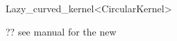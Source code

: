 \begin{ccRefClass}{Lazy_curved_kernel<CircularKernel>}

\ccDefinition



\ccParameters

?? see manual for the new 

\end{ccRefClass}
